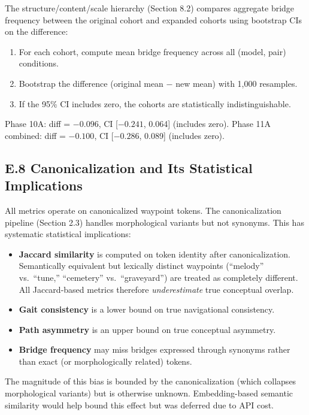 The structure/content/scale hierarchy (Section 8.2) compares aggregate bridge frequency between the original cohort and expanded cohorts using bootstrap CIs on the difference:

\begin{enumerate}
\def\labelenumi{\arabic{enumi}.}
\tightlist
\item
  For each cohort, compute mean bridge frequency across all (model, pair) conditions.
\item
  Bootstrap the difference (original mean \(-\) new mean) with 1,000 resamples.
\item
  If the 95\% CI includes zero, the cohorts are statistically indistinguishable.
\end{enumerate}

Phase 10A: diff = \(-0.096\), CI {[}\(-0.241\), 0.064{]} (includes zero). Phase 11A combined: diff = \(-0.100\), CI {[}\(-0.286\), 0.089{]} (includes zero).

\subsection{E.8 Canonicalization and Its Statistical Implications}\label{e.8-canonicalization-and-its-statistical-implications}

All metrics operate on canonicalized waypoint tokens. The canonicalization pipeline (Section 2.3) handles morphological variants but not synonyms. This has systematic statistical implications:

\begin{itemize}
\tightlist
\item
  \textbf{Jaccard similarity} is computed on token identity after canonicalization. Semantically equivalent but lexically distinct waypoints (``melody'' vs.~``tune,'' ``cemetery'' vs.~``graveyard'') are treated as completely different. All Jaccard-based metrics therefore \emph{underestimate} true conceptual overlap.
\item
  \textbf{Gait consistency} is a lower bound on true navigational consistency.
\item
  \textbf{Path asymmetry} is an upper bound on true conceptual asymmetry.
\item
  \textbf{Bridge frequency} may miss bridges expressed through synonyms rather than exact (or morphologically related) tokens.
\end{itemize}

The magnitude of this bias is bounded by the canonicalization (which collapses morphological variants) but is otherwise unknown. Embedding-based semantic similarity would help bound this effect but was deferred due to API cost.

